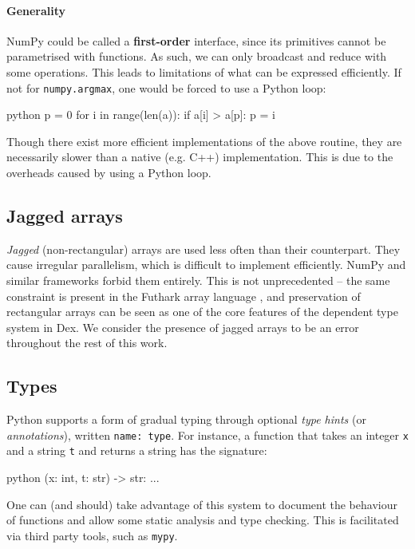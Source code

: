 \paragraph{Generality} NumPy could be called a \textbf{first-order} interface, since its primitives cannot be parametrised with functions. As such, we can only broadcast and reduce with some operations. This leads to limitations of what can be expressed efficiently. If not for \texttt{numpy.argmax}, one would be forced to use a Python loop:
\begin{center}
\begin{cminted}{python}
p = 0
for i in range(len(a)): 
    if a[i] > a[p]: p = i
\end{cminted}
\end{center}
Though there exist more efficient implementations of the above routine, they are necessarily slower than a native (e.g. C++) implementation. This is due to the overheads caused by using a Python loop.

\subsection{Jagged arrays}

\textit{Jagged} (non-rectangular) arrays are used less often than their counterpart. They cause irregular parallelism, which is difficult to implement efficiently. NumPy and similar frameworks forbid them entirely. This is not unprecedented -- the same constraint is present in the Futhark array language \cite{henriksen2017futhark}, and preservation of rectangular arrays can be seen as one of the core features of the dependent type system in Dex. We consider the presence of jagged arrays to be an error throughout the rest of this work.

\subsection{Types}

Python supports a form of gradual typing through optional \textit{type hints} (or \textit{annotations}), written \texttt{name: type}. For instance, a function that takes an integer \texttt{x} and a string \texttt{t} and returns a string has the signature:
\begin{center}
\begin{cminted}{python}
(x: int, t: str) -> str: ...
\end{cminted}
\end{center}
One can (and should) take advantage of this system to document the behaviour of functions and allow some static analysis and type checking. This is facilitated via third party tools, such as \texttt{mypy}.

